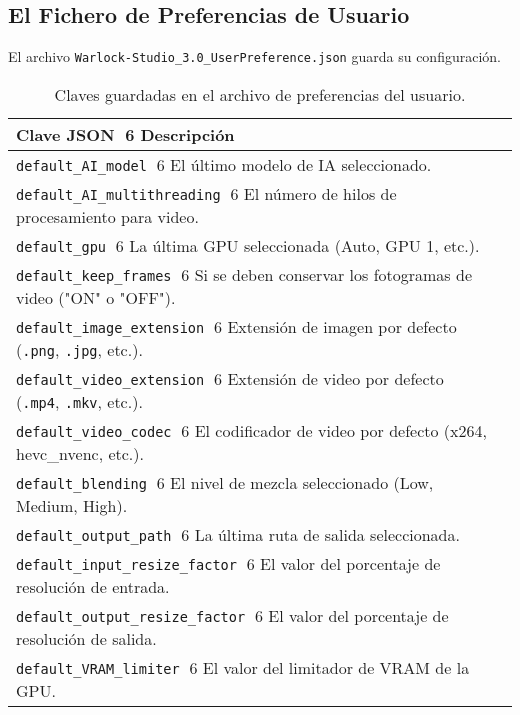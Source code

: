 \documentclass[11pt, a4paper]{article}
\newcommand{\inlinecode}[1]{\colorbox{WarlockLightGray}{\small\texttt{#1}}}
\begin{document}
\subsection{El Fichero de Preferencias de Usuario}
El archivo \inlinecode{Warlock-Studio_3.0_UserPreference.json} guarda su configuración.
\begin{table}[H]
    \centering
    \small %
    \begin{tabularx}{\textwidth}{l X}
        \toprule
        \textbf{Clave JSON} 6 \textbf{Descripción} \\
        \midrule
        \texttt{default\_AI\_model} 6 El último modelo de IA seleccionado. \\
        \texttt{default\_AI\_multithreading} 6 El número de hilos de procesamiento para video. \\
        \texttt{default\_gpu} 6 La última GPU seleccionada (Auto, GPU 1, etc.). \\
        \texttt{default\_keep\_frames} 6 Si se deben conservar los fotogramas de video ("ON" o "OFF"). \\
        \texttt{default\_image\_extension} 6 Extensión de imagen por defecto (\texttt{.png}, \texttt{.jpg}, etc.). \\
        \texttt{default\_video\_extension} 6 Extensión de video por defecto (\texttt{.mp4}, \texttt{.mkv}, etc.). \\
        \texttt{default\_video\_codec} 6 El codificador de video por defecto (x264, hevc\_nvenc, etc.). \\
        \texttt{default\_blending} 6 El nivel de mezcla seleccionado (Low, Medium, High). \\
        \texttt{default\_output\_path} 6 La última ruta de salida seleccionada. \\
        \texttt{default\_input\_resize\_factor} 6 El valor del porcentaje de resolución de entrada. \\
        \texttt{default\_output\_resize\_factor} 6 El valor del porcentaje de resolución de salida. \\
        \texttt{default\_VRAM\_limiter} 6 El valor del limitador de VRAM de la GPU. \\
        \bottomrule
    \end{tabularx}
    \caption{Claves guardadas en el archivo de preferencias del usuario.}
\end{table}
\end{document}
